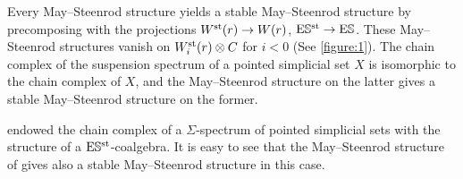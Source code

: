 \begin{example}
	Every May--Steenrod structure yields a stable May--Steenrod structure by precomposing with the projections $\Wst(r) \to \W{r}$, $\ESst\to \ES$. These May--Steenrod structures vanish on $\Wst[i](r) \ot \ucadenas$ for $i<0$ (See \cref{figure:1}). The chain complex of the suspension spectrum of a pointed simplicial set $X$ is isomorphic to the chain complex of $X$, and the May--Steenrod structure on the latter gives a stable May--Steenrod structure on the former. 
\end{example}

\begin{example}
	\cite{Gill2020} endowed the chain complex of a $\Sigma$-spectrum of pointed simplicial sets with the structure of a $\ESst$-coalgebra. It is easy to see that the May--Steenrod structure of \cite{medina2021may_st} gives also a stable May--Steenrod structure in this case.
\end{example}



